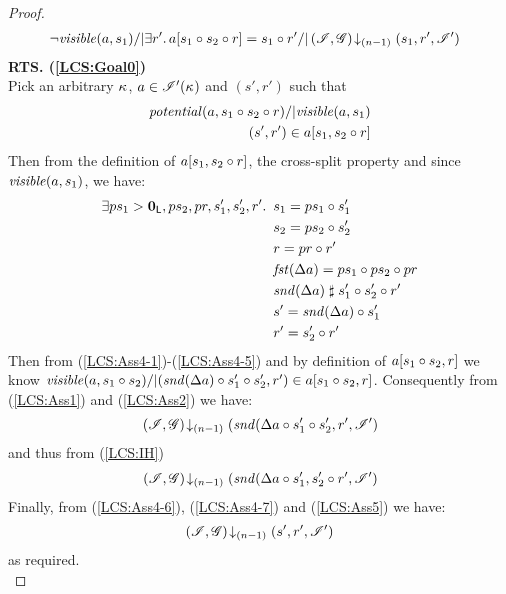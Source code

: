 \begin{lemma}
\begin{proof}
\begin{align}
%  
  &\ \neg\m{visible}(a,s_1) /| \exsts{r'} a[s_1 \composeL s_2 \composeL r] = s_1 \composeL r' /| \extendsAMUpto{\lmod, \gmod}{(n-1)}{s_1}{r'}{\lmod'}  \label{LCS:Goal3}
%
\end{align}
%
\textbf{RTS. (\ref{LCS:Goal0})}\\
Pick an arbitrary $\kappa_{}$, $a \in \mathscr{I}'(\kappa_{})$ and $(s', r')$ such that 
\begin{align}
	\mathit{potential}(a, s_1 \circ s_2 \circ r) /| \mathit{visible}(a, s_1) \label{LCS:Ass2}\\
	(s', r') \in a[s_1, s_2 \circ r] \label{LCS:Ass3}
\end{align}
%
Then from the definition of $a[s_1, s_2 \circ r]$, the cross-split property and since $\mathit{visible}(a, s_1)$, we have:
%
\begin{align}
	\exists ps_1 > \mathbf{0}_{\textsf{L}}, ps_2, pr, s'_1, s'_2, r'.\,\ & s_1 = ps_1 \circ  s'_1 \label{LCS:Ass4-1}\\
	& s_2 = ps_2 \circ s'_2 \label{LCS:Ass4-2}\\
	& r = pr \circ r' \label{LCS:Ass4-3}\\
	& \mathit{fst}(\Delta {a}) = ps_1 \circ ps_2 \circ pr \label{LCS:Ass4-4}\\
	& \mathit{snd}(\Delta {a}) \mathrel{\sharp} s'_1 \circ s'_2 \circ r'  \label{LCS:Ass4-5}\\
	& s' = \mathit{snd}(\Delta {a}) \circ s'_1 \label{LCS:Ass4-6}\\
	& r' = s'_2 \circ r' \label{LCS:Ass4-7}
\end{align}
% 
Then from (\ref{LCS:Ass4-1})-(\ref{LCS:Ass4-5}) and by definition of $a[s_1 \circ s_2, r]$ we know $\mathit{visible}(a, s_1 \circ s_2) /| (\mathit{snd}(\Delta {a}) \circ s'_1 \circ s'_2, r') \in a[s_1 \circ s_2, r]$. Consequently from (\ref{LCS:Ass1}) and (\ref{LCS:Ass2}) we have:
%
\begin{equation}
	\left(\mathscr{I}, \mathscr{G}\right) \!\downarrow_{(n-1)} \left(\mathit{snd}(\Delta {a} \circ s'_1 \circ s'_2, r', \mathscr{I}'\right) \nonumber
\end{equation}
%
and thus from (\ref{LCS:IH})
%
\begin{align}
	\left(\mathscr{I}, \mathscr{G}\right) \!\downarrow_{(n-1)} \left(\mathit{snd}(\Delta {a} \circ s'_1, s'_2 \circ r', \mathscr{I}'\right) \label{LCS:Ass5}
\end{align}
% 
Finally, from (\ref{LCS:Ass4-6}), (\ref{LCS:Ass4-7}) and (\ref{LCS:Ass5}) we have: 
%
\begin{align}
	\left(\mathscr{I}, \mathscr{G}\right) \!\downarrow_{(n-1)} \left(s', r', \mathscr{I}'\right) \nonumber
\end{align}
% 
as required.\\


\end{proof}
\end{lemma}
